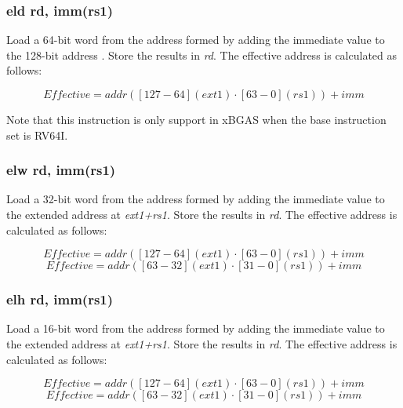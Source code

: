 \documentclass{article}
\begin{document}
\subsubsection{eld rd, imm(rs1)}
Load a 64-bit word from the address formed by adding the immediate value to the 
128-bit address .  Store the results in \textit{rd}.  The effective 
address is calculated as follows: 

\begin{equation}
Effective = addr([127-64](ext1) \cdot [63-0](rs1))+imm
\end{equation}

\begin{commentary}
Note that this instruction is only support in xBGAS when the base 
instruction set is RV64I.
\end{commentary}

\subsubsection{elw rd, imm(rs1)}
Load a 32-bit word from the address formed by adding the immediate value to the 
extended address at \textit{ext1+rs1}.  Store the results in \textit{rd}.  The effective 
address is calculated as follows: 

\begin{equation}
Effective = addr([127-64](ext1) \cdot [63-0](rs1))+imm
\end{equation}
\begin{equation}
Effective = addr([63-32](ext1) \cdot [31-0](rs1))+imm
\end{equation}

\subsubsection{elh rd, imm(rs1)}
Load a 16-bit word from the address formed by adding the immediate value to the 
extended address at \textit{ext1+rs1}.  Store the results in \textit{rd}.  The effective 
address is calculated as follows: 

\begin{equation}
Effective = addr([127-64](ext1) \cdot [63-0](rs1))+imm
\end{equation}
\begin{equation}
Effective = addr([63-32](ext1) \cdot [31-0](rs1))+imm
\end{equation}

\end{document}
